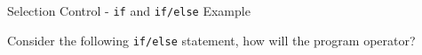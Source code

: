 \begin{frame}[fragile]{Selection Control - \texttt{if} and
\texttt{if/else} Example}

Consider the following \texttt{if/else} statement, how will the program
operator?

\begin{Shaded}
\begin{Highlighting}[]
\StringTok{ }\NormalTok{)}
  \NormalTok{(}\NormalTok{)}
  \NormalTok{(}\NormalTok{)}
  \NormalTok{(}\NormalTok{);}
\end{Highlighting}
\end{Shaded}

\end{frame}

